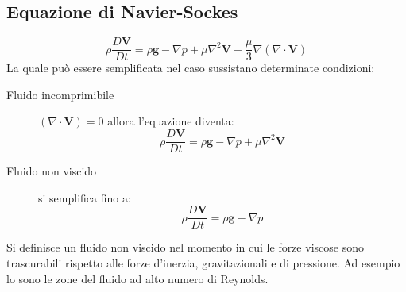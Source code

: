 \subsection{Equazione di Navier-Sockes}
\begin{equation}
\rho \frac{D\mathbf{V}}{Dt} = \rho \mathbf{g} - \nabla p + \mu \nabla^2\mathbf{V} + \frac{\mu}{3}\nabla(\nabla \cdot \mathbf{V})
\label{eqn:NavierStockes} 
\end{equation}
La quale può essere semplificata nel caso sussistano determinate condizioni:
\begin{description}
\item[Fluido incomprimibile] $(\nabla \cdot \mathbf{V}) = 0 $ allora l'equazione diventa:
\begin{equation}
\rho \frac{D\mathbf{V}}{Dt} = \rho \mathbf{g} - \nabla p + \mu \nabla^2\mathbf{V}
\end{equation}
\item[Fluido non viscido] si semplifica fino a:
\begin{equation}
\rho \frac{D\mathbf{V}}{Dt} = \rho \mathbf{g} - \nabla p
\end{equation}
\end{description}
Si definisce un fluido non viscido nel momento in cui le forze viscose sono trascurabili rispetto alle forze d'inerzia, gravitazionali e di pressione.
Ad esempio lo sono le zone del fluido ad alto numero di Reynolds.